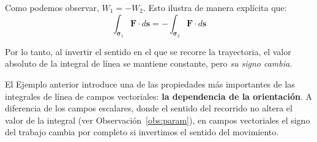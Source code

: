 Como podemos observar, $W_1 = -W_2$.  Esto ilustra de manera explícita que:
\[ \int_{\boldsymbol{\sigma}_1} \mathbf{F} \cdot d\mathbf{s} = -\int_{\boldsymbol{\sigma}_2} \mathbf{F} \cdot d\mathbf{s} \]

Por lo tanto, al invertir el sentido en el que se recorre la trayectoria, el valor absoluto de la integral de línea se mantiene constante, pero \emph{su signo cambia}.







\begin{obs}\label{obs:orientacion_vectorial}
El Ejemplo anterior introduce una de las propiedades más importantes de las integrales de línea de campos vectoriales: \textbf{la dependencia de la orientación}.  A diferencia de los campos escalares, donde el sentido del recorrido no altera el valor de la integral (ver Observación~\ref{obs:param}), en campos vectoriales el signo del trabajo cambia por completo si invertimos el sentido del movimiento. 
\end{obs}


